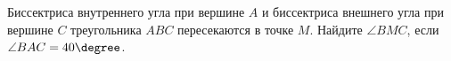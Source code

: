 \begin{ex}
	\begin{condition}
		Биссектриса внутреннего угла при вершине \( A  \) и биссектриса внешнего угла при вершине \( C  \) треугольника \( ABC  \) пересекаются в точке \( M  \). Найдите \( \angle BMC \), если \( \angle BAC = 40\degree\).
	\end{condition}
\end{ex}